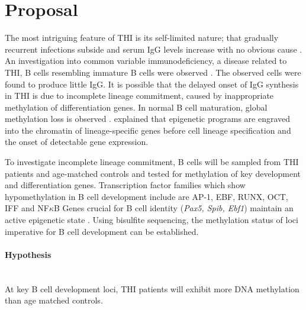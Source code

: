 \documentclass[12pt]{article}
\begin{document}
	\section{Proposal}
	
		The most intriguing feature of THI is its self-limited nature; that gradually recurrent infections subside and serum IgG levels increase with no obvious cause  \citep{Tiller78,Soothill68,Siegel81,McGeady87,Dressler89,Kowalczyk97,Dalal98}. 
		An investigation into common variable immunodeficiency, a disease related to THI, B cells resembling immature B cells were observed \citep{Fiorilli86}. 
		The observed cells were found to produce little IgG. 
		It is possible that the delayed onset of IgG synthesis in THI is due to incomplete lineage commitment, caused by inappropriate methylation of differentiation genes. 
		In normal B cell maturation, global methylation loss is observed \cite{Oakes16}.
		\citet{Tagoh04} explained that epigenetic programs are engraved into the chromatin of lineage-specific genes before cell lineage specification and the onset of detectable gene expression.
		
		To investigate incomplete lineage commitment, B cells will be sampled from THI patients and age-matched controls and tested for methylation of key development and differentiation genes. 
		Transcription factor families which show hypomethylation in B cell development include are AP-1, EBF, RUNX, OCT, IFF and NF$\kappa$B
		Genes crucial for B cell identity (\textit{Pax5, Spib, Ebf1}) maintain an active epigenetic state \citep{Li13,Choukrallah14}. 
		Using bisulfite sequencing, the methylation status of loci imperative for B cell development can be established. 
		
		\paragraph{Hypothesis}
			~\\
			At key B cell development loci, THI patients will exhibit more DNA methylation than age matched controls.


	
	
	\newpage
	
	
	
\end{document}
